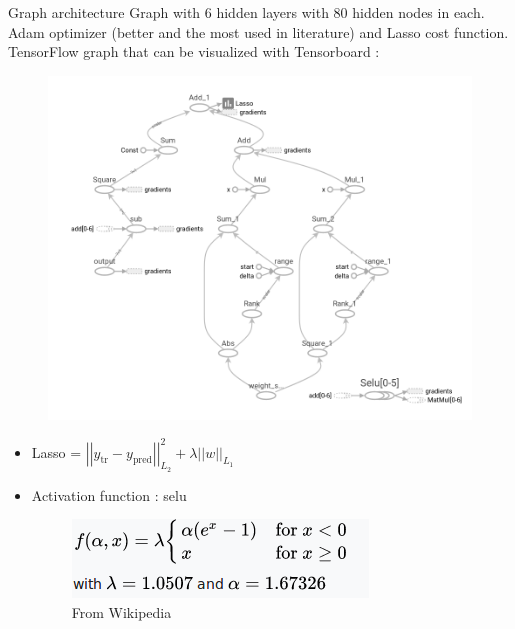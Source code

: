 \documentclass[10pt,
			   xcolor=svgnames,
			   hyperref={linkcolor=red, citecolor = DarkGreen, colorlinks=true, urlcolor=Navy}]{beamer}
\newcommand{\norm}[1]{
	\left \vert \left \vert #1 \right \vert  \right \vert
}
\newcommand{\sarrow}{\item[\color{blue!50!black!70!orange!60} \tiny{\ding{55}}]}
\newcommand\bk{\color{black}}
\newcommand\navy{\color{navy}}
\newcommand\red{\color{red}}
\begin{document}
\begin{frame}{Graph architecture}
	Graph with \red 6 hidden layers \bk with \red 80 hidden nodes \bk in each. Adam optimizer (better and the most used in literature) and \navy Lasso \bk cost function.\\
	
	TensorFlow graph that can be visualized with Tensorboard :
	
	\begin{multicols}{2}	
		\noindent		
		\begin{figure}[H]
		\centering
		\includegraphics[scale=0.2]{Graphs.png}
		\end{figure}
	
	\columnbreak
		\centering
		\vspace{1cm}
		\begin{itemize}
			\sarrow \footnotesize Lasso = $\norm{ y_{\text{tr}} - y_{\text{pred}}}^2_{L_2} + \lambda \norm{w}_{L_1}$		 \\[1.5cm]
		
			\sarrow Activation function : selu
			\begin{figure}[H]
			\centering
			\includegraphics[scale=0.3]{SELU.png}
			\caption{From Wikipedia}
			\end{figure}
		
		\end{itemize}
	\end{multicols}
\end{frame}
\end{document}
